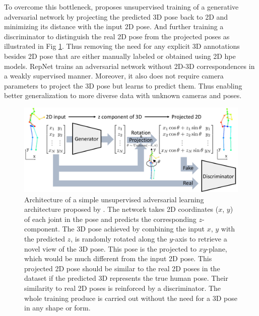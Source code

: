 To overcome this bottleneck, \cite{unsupervisedAdversarial} proposes unsupervised training of a generative adversarial network by projecting the predicted 3D pose back to 2D and minimizing its distance with the input 2D pose. And further training a discriminator to distinguish the real 2D pose from the projected poses as illustrated in Fig \ref{fig:adverserial_arch}. Thus removing the need for any explicit 3D annotations besides 2D pose that are either manually labeled or obtained using 2D \ac{hpe} models. RepNet \cite{repnet} trains an adversarial network without 2D-3D correspondences in a weakly supervised manner. Moreover, it also does not require camera parameters to project the 3D pose but learns to predict them. Thus enabling better generalization to more diverse data with unknown cameras and poses.

\begin{figure}[h]
    \centering
    \includegraphics[width=\linewidth]{figures/background/adverserial_arch.pdf}
    \caption{Architecture of a simple unsupervised adversarial learning architecture proposed by \cite{unsupervisedAdversarial}. The network takes 2D coordinates ($x$, $y$) of each joint in the pose and predicts the corresponding $z$-component. The 3D pose achieved by combining the input $x$, $y$ with the predicted $z$, is randomly rotated along the $y$-axis to retrieve a novel view of the 3D pose. This pose is the projected to $xy$-plane, which would be much different from the input 2D pose. This projected 2D pose should be similar to the real 2D poses in the dataset if the predicted 3D represents the true human pose. Their similarity to real 2D poses is reinforced by a discriminator. The whole training produce is carried out without the need for a 3D pose in any shape or form.}
    \label{fig:adverserial_arch}
\end{figure}

